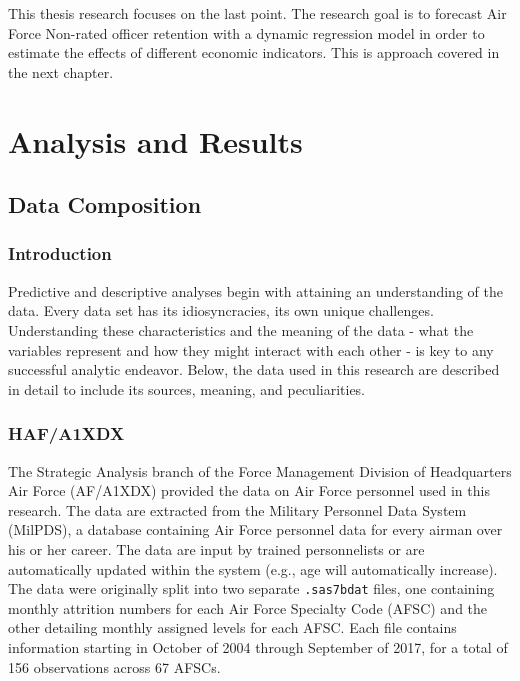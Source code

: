 \documentclass[12pt,letterpaper,toc=flat,oneside]{report}
\theoremstyle{definition}
\theoremstyle{definition}
\theoremstyle{definition}
\theoremstyle{remark}
\begin{document}
This thesis research focuses on the last point. The research goal is to
forecast Air Force Non-rated officer retention with a dynamic regression
model in order to estimate the effects of different economic indicators.
This is approach covered in the next chapter.

\newpage

\hypertarget{analysis-and-results}{%
\chapter{Analysis and Results}\label{analysis-and-results}}

\hypertarget{data-composition}{%
\section{Data Composition}\label{data-composition}}

\hypertarget{introduction-1}{%
\subsection{Introduction}\label{introduction-1}}

Predictive and descriptive analyses begin with attaining an
understanding of the data. Every data set has its idiosyncracies, its
own unique challenges. Understanding these characteristics and the
meaning of the data - what the variables represent and how they might
interact with each other - is key to any successful analytic endeavor.
Below, the data used in this research are described in detail to include
its sources, meaning, and peculiarities.

\hypertarget{hafa1xdx}{%
\subsection{HAF/A1XDX}\label{hafa1xdx}}

The Strategic Analysis branch of the Force Management Division of
Headquarters Air Force (AF/A1XDX) provided the data on Air Force
personnel used in this research. The data are extracted from the
Military Personnel Data System (MilPDS), a database containing Air Force
personnel data for every airman over his or her career. The data are
input by trained personnelists or are automatically updated within the
system (e.g., age will automatically increase). The data were originally
split into two separate \texttt{.sas7bdat} files, one containing monthly
attrition numbers for each Air Force Specialty Code (AFSC) and the other
detailing monthly assigned levels for each AFSC. Each file contains
information starting in October of 2004 through September of 2017, for a
total of 156 observations across 67 AFSCs.
\end{document}
